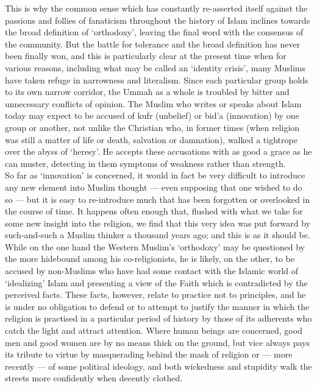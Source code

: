\documentclass[10pt, twoside]{book}
\begin{document}
This is why the common sense which has constantly re\hyp{}asserted itself against the passions and follies of fanaticism throughout the history of Islam inclines towards the broad definition of `orthodoxy', leaving the final word with the consensus of the community. But the battle for tolerance and the broad definition has never been finally won, and this is particularly clear at the present time when for various reasons, including what may be called an `identity crisis', many Muslims have taken refuge in narrowness and literalism. Since each particular group holds to its own narrow corridor, the Ummah as a whole is troubled by bitter and unnecessary conflicts of opinion. The Muslim who writes or speaks about Islam today may expect to be accused of kufr (unbelief) or bid'a (innovation) by one group or another, not unlike the Christian who, in former times (when religion was still a matter of life or death, salvation or damnation), walked a tightrope over the abyss of `heresy'. He accepts these accusations with as good a grace as he can muster, detecting in them symptoms of weakness rather than strength. \\

So far as `innovation' is concerned, it would in fact be very difficult to introduce any new element into Muslim thought --- even supposing that one wished to do so --- but it is easy to re\hyp{}introduce much that has been forgotten or overlooked in the course of time. It happens often enough that, flushed with what we take for some new insight into the religion, we find that this very idea was put forward by such\hyp{}and\hyp{}such a Muslim thinker a thousand years ago; and this is as it should be. \\

While on the one hand the Western Muslim's `orthodoxy' may be questioned by the more hidebound among his co\hyp{}religionists, he is likely, on the other, to be accused by non\hyp{}Muslims who have had some contact with the Islamic world of `idealizing' Islam and presenting a view of the Faith which is contradicted by the perceived facts. These facts, however, relate to practice not to principles, and he is under no obligation to defend or to attempt to justify the manner in which the religion is practised in a particular period of history by those of its adherents who catch the light and attract attention. Where human beings are concerned, good men and good women are by no means thick on the ground, but vice always pays its tribute to virtue by masquerading behind the mask of religion or --- more recently --- of some political ideology, and both wickedness and stupidity walk the streets more confidently when decently clothed. \\
\end{document}
